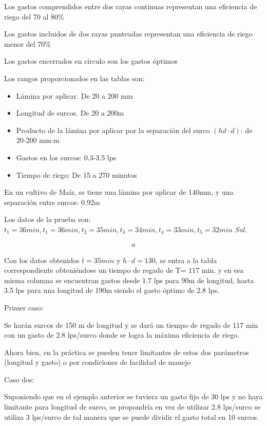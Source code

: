 Los gastos comprendidos entre dos rayas continuas representan una eficiencia de riego del 70 al 80\%

Los gastos incluidos de dos rayas punteadas representan una eficiencia de riego menor del 70\%

Los gastos encerrados en círculo son los gastos óptimos

Los rangos proporcionados en las tablas son:
\begin{itemize}
    \item Lámina por aplicar. De 20 a 200 mm
    \item Longitud de surcos. De 20 a 200m
    \item Producto de la lámina por aplicar por la separación del surco $(hd\cdot d)$: de 20-200 mm-m
    \item Gastos en los surcos: 0.3-3.5 lps
    \item Tiempo de riego: De 15 a 270 minutos
\end{itemize}
\begin{example}
    En un cultivo de Maíz, se tiene una lámina por aplicar de 140mm, y una separación entre surcos: 0.92m

    Los datos de la prueba son: $t_1= 36min, t_1= 36min, t_2= 35 min, t_3= 34 min, t_4= 33 min, t_5= 32 min $
    \textit{ Sol. }

    \begin{align*}
        a
    \end{align*}

    Con los datos obtenidos $\bar{t} = 35min$ y $h\cdot d= 130$, se entra a la tabla correspondiente obteniéndose un tiempo de regado de T= 117 min. y en esa misma columna se encuentran gastos desde 1.7 lps para 90m de longitud, hasta 3.5 lps para una longitud de 190m siendo el gasto óptimo de 2.8 lps.

\end{example}

Primer caso:

Se harán surcos de 150 m de longitud y se dará un tiempo de regado de 117 min con un gasto de 2.8 lps/surco donde se logra la máxima eficiencia de riego.

Ahora bien, en la práctica se pueden tener limitantes de estos dos parámetros (longitud y gasto) o por condiciones de facilidad de manejo

Caso dos:

Suponiendo que en el ejemplo anterior se tuviera un gasto fijo de 30 lps y no haya limitante para longitud de surco, se propondría en vez de utilizar 2.8 lps/surco se utiliza 3 lps/surco de tal manera que se puede dividir el gasto total en 10 surcos.

